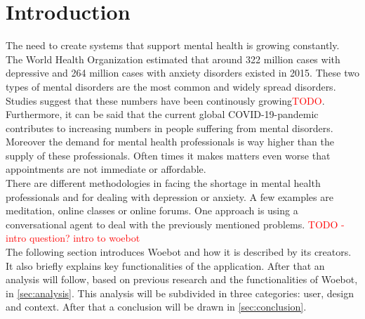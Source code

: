 \section{Introduction}
The need to create systems that support mental health is growing constantly. The World Health Organization estimated that around 322 million cases with depressive and 264 million cases with anxiety disorders existed in 2015\cite{who2017}. These two types of mental disorders are the most common and widely spread disorders. Studies suggest that these numbers have been continously growing\cite{}\textcolor{red}{TODO}. Furthermore, it can be said that the current global COVID-19-pandemic contributes to increasing numbers in people suffering from mental disorders\cite{corona-mental}. Moreover the demand for mental health professionals is way higher than the supply of these professionals\cite{indian-shortage, rural-shortage}. Often times it makes matters even worse that appointments are not immediate or affordable.\\

There are different methodologies in facing the shortage in mental health professionals and for dealing with depression or anxiety. A few examples are meditation, online classes or online forums. One approach is using a conversational agent to deal with the previously mentioned problems. \textcolor{red}{TODO - intro question?} \textcolor{red}{intro to woebot}\\

The following section introduces Woebot and how it is described by its creators. It also briefly explains key functionalities of the application. After that an analysis will follow, based on previous research and the functionalities of Woebot, in \autoref{sec:analysis}. This analysis will be subdivided in three categories: user, design and context. After that a conclusion will be drawn in \autoref{sec:conclusion}.